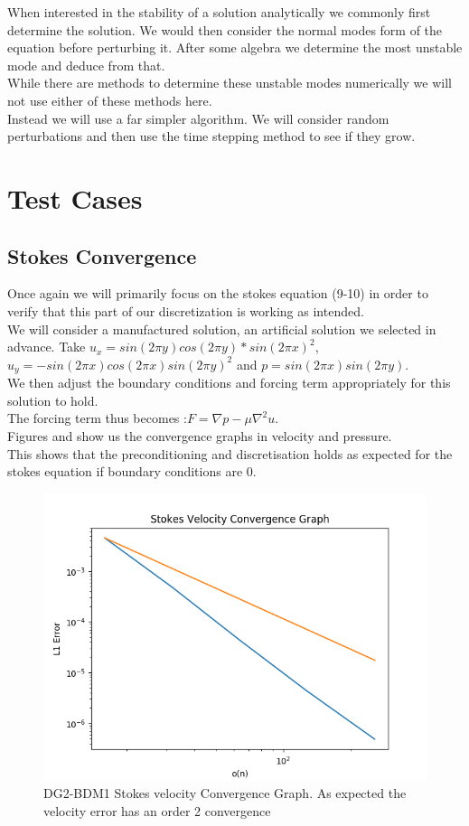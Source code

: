 \documentclass[11pt,twoside,a4paper]{article}
\begin{document}
When interested in the stability of a solution analytically we commonly first determine the solution. We would then consider the normal modes form of the equation before perturbing it. After some algebra we determine the most unstable mode and deduce from that.\\
While there are methods to determine these unstable modes numerically we will not use either of these methods here.\\
Instead we will use a far simpler algorithm.
We will consider random perturbations and then use the time stepping method to see if they grow.

\section{Test Cases}
\subsection{Stokes Convergence}

Once again we will primarily focus on the stokes equation (9-10) in order to verify that this part of our discretization is working as intended.\\
We will consider a manufactured solution, an artificial solution we selected in advance. Take $u_x = sin(2 \pi y) cos(2 \pi y)*sin(2 \pi x)^2$, $u_y= -sin(2 \pi x) cos(2 \pi x) sin(2 \pi y)^2$ and $p = sin(2 \pi x) sin(2 \pi y)$.\\
We then adjust the boundary conditions and forcing term appropriately for this solution to hold.\\
 The forcing term thus becomes :$F = \nabla p - \mu \nabla^2 u$.\\
Figures and show us the convergence graphs in velocity and pressure.\\
This shows that the preconditioning and discretisation holds as expected for the stokes equation if boundary conditions are $0$.
\\

\begin{figure}
  \includegraphics[width=\linewidth]{stokes_convergence_dbc0.png}
  \caption{DG2-BDM1 Stokes velocity Convergence Graph. As expected the velocity error has an order 2 convergence}
\end{figure}
\end{document}
